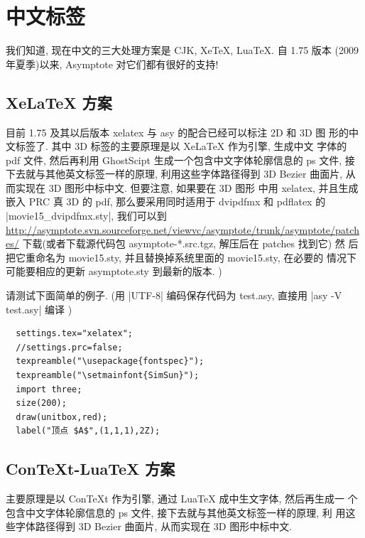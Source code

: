 \documentclass[nofonts,CJKnormalspaces]{ctexbook}[2009/05/20]
\begin{document}
\section{中文标签}
我们知道, 现在中文的三大处理方案是 CJK, XeTeX, LuaTeX. 自 1.75 版本
(2009 年夏季)以来, Asymptote 对它们都有很好的支持!

\subsection{XeLaTeX 方案}
目前 1.75 及其以后版本 xelatex 与 asy 的配合已经可以标注 2D 和 3D 图
形的中文标签了. 其中 3D 标签的主要原理是以 XeLaTeX 作为引擎, 生成中文
字体的 pdf 文件, 然后再利用 GhostScipt 生成一个包含中文字体轮廓信息的
ps 文件, 接下去就与其他英文标签一样的原理, 利用这些字体路径得到 3D
Bezier 曲面片, 从而实现在 3D 图形中标中文.  但要注意, 如果要在 3D 图形
中用 xelatex, 并且生成嵌入 PRC 真 3D 的 pdf, 那么要采用同时适用于
dvipdfmx 和 pdflatex 的 |movie15_dvipdfmx.sty|, 我们可以到
\url{http://asymptote.svn.sourceforge.net/viewvc/asymptote/trunk/asymptote/patches/}
下载(或者下载源代码包 asymptote-*.src.tgz, 解压后在 patches 找到它) 然
后把它重命名为 movie15.sty, 并且替换掉系统里面的 movie15.sty, 在必要的
情况下可能要相应的更新 asymptote.sty 到最新的版本.
\label{movie15:xelatex})

请测试下面简单的例子. (用 |UTF-8| 编码保存代码为 test.asy, 直接用
|asy -V test.asy| 编译 )
\begin{lstlisting}
  settings.tex="xelatex";
  //settings.prc=false;
  texpreamble("\usepackage{fontspec}");
  texpreamble("\setmainfont{SimSun}");
  import three;
  size(200);
  draw(unitbox,red);
  label("顶点 $A$",(1,1,1),2Z);
\end{lstlisting}

\subsection{ConTeXt-LuaTeX 方案}
主要原理是以 ConTeXt 作为引擎, 通过 LuaTeX 成中生文字体, 然后再生成一
个包含中文字体轮廓信息的 ps 文件, 接下去就与其他英文标签一样的原理, 利
用这些字体路径得到 3D Bezier 曲面片, 从而实现在 3D 图形中标中文.
\end{document}
